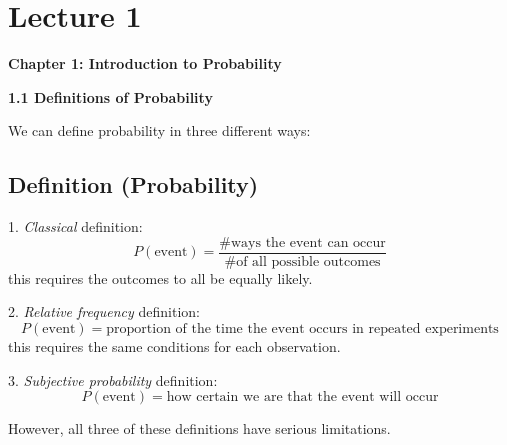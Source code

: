 \section{Lecture 1}

\textbf{\textbf{Chapter 1: Introduction to Probability}}

\textbf{1.1 Definitions of Probability}

We can define probability in three different ways:

\begin{defbox}
    \subsection{Definition (Probability)}
    1. \emph{Classical} definition:
    \[ P(\text{event})=\frac{\text{\# ways the event can occur}}
    {\text{\# of all possible outcomes}} \]
    this requires the outcomes to all be equally likely.
    
    2. \emph{Relative frequency} definition:
    \[ P(\text{event})=\text{proportion of the time the event occurs in repeated experiments} \]
    this requires the same conditions for each observation.
    
    3. \emph{Subjective probability} definition:
    \[ P(\text{event})=\text{how certain we are that the event will occur} \]
\end{defbox}
However, all three of these definitions have serious limitations.
